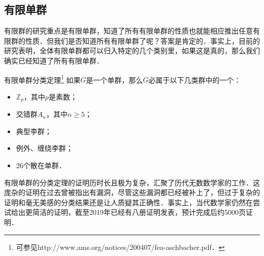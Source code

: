 \subsection{有限单群}

有限群的研究重点是有限单群，知道了所有有限单群的性质也就能相应推出任意有限群的性质．但我们是否知道所有有限单群了呢？答案是肯定的．事实上，目前的研究表明，全体有限单群都可以归入特定的几个类别里，如果这是真的，那么我们确实已经知道了所有有限单群．

\begin{definition}{有限单群分类定理\footnote{可参见http://www.ams.org/notices/200407/fea-aschbacher.pdf．}}
如果$G$是一个单群，那么$G$必属于以下几类群中的一个：
\begin{itemize}
\item $\mathbb{Z}_p$，其中$p$是素数；
\item 交错群$A_n$，其中$n\geq 5$；
\item 典型李群；
\item 例外、缠绕李群；
\item 26个散在单群．
\end{itemize}
\end{definition}

有限单群的分类定理的证明历时长且极为复杂，汇聚了历代无数数学家的工作．这庞杂的证明在过去曾被指出有漏洞，尽管这些漏洞都已经被补上了，但过于复杂的证明和毫无美感的分类结果还是让人质疑其正确性．事实上，当代数学家仍然在尝试给出更简洁的证明，截至2019年已经有八册证明发表，预计完成后约5000页证明．













